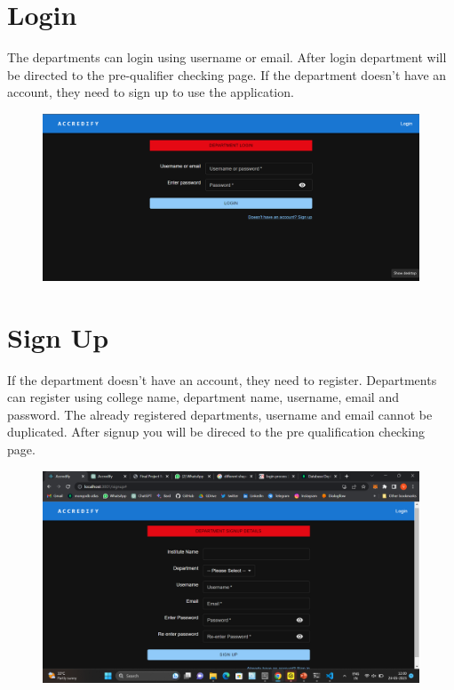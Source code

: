 \documentclass[a4paper,11pt]{report}
\begin{document}
\section{Login}
The departments can login using username or email. After login department will be directed to the pre-qualifier checking page. 
If the department doesn't have an account, they need to sign up to use the application. 
\begin{figure}[h]
	\centering
	\hspace{21pt}
	\includegraphics[width=.70\linewidth]{accredify1.png}
	\label{fig:logo.png}
\end{figure}

\section{Sign Up}
If the department doesn't have an account, they need to register. Departments can register using college name, department name, username, email and password. The already registered departments, username and email cannot be duplicated. After signup you will be direced to the pre qualification checking page. 
\begin{figure}[h]
	\centering
	\hspace{21pt}
	\includegraphics[width=.70\linewidth]{accredify2.png}
	\label{fig:logo.png}
\end{figure}
\end{document}
